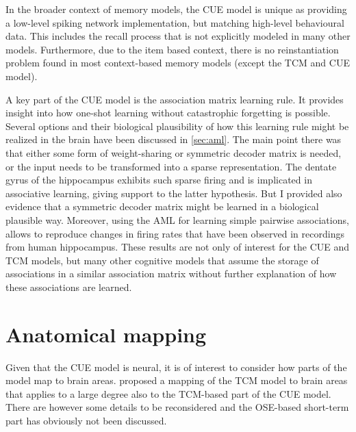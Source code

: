 In the broader context of memory models, the CUE model is unique as providing a low-level spiking network implementation, but matching high-level behavioural data.
This includes the recall process that is not explicitly modeled in many other models.
Furthermore, due to the item based context, there is no reinstantiation problem found in most context-based memory models (except the TCM and CUE model).

A key part of the CUE model is the association matrix learning rule.
It provides insight into how one-shot learning without catastrophic forgetting is possible.
Several options and their biological plausibility of how this learning rule might be realized in the brain have been discussed in \cref{sec:aml}.
The main point there was that either some form of weight-sharing or symmetric decoder matrix is needed, or the input needs to be transformed into a sparse representation.
The dentate gyrus of the hippocampus exhibits such sparse firing and is implicated in associative learning, giving support to the latter hypothesis.
But I provided also evidence that a symmetric decoder matrix might be learned in a biological plausible way.
Moreover, using the AML for learning simple pairwise associations, allows to reproduce changes in firing rates that have been observed in recordings from human hippocampus.
These results are not only of interest for the CUE and TCM models, but many other cognitive models that assume the storage of associations in a similar association matrix without further explanation of how these associations are learned.




\section{Anatomical mapping}

Given that the CUE model is neural, it is of interest to consider how parts of the model map to brain areas.
\Textcite{howard2005} proposed a mapping of the TCM model to brain areas that applies to a large degree also to the TCM-based part of the CUE model.
There are however some details to be reconsidered and the OSE-based short-term part has obviously not been discussed.

